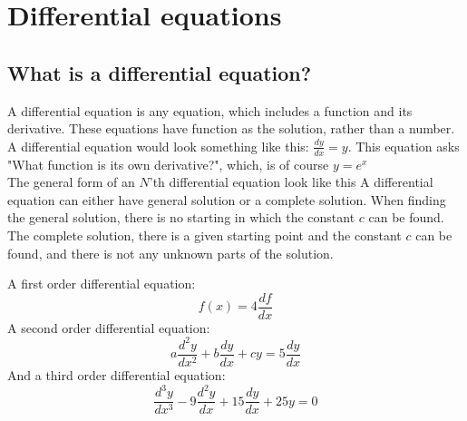 \chapter{Differential equations}
\section{What is a differential equation?}
A differential equation is any equation, which includes a function and its derivative. These equations have function as the solution, rather than a number. 
\\
A differential equation would look something like this: $\frac{dy}{dx} = y$. This equation asks "What function is its own derivative?", which, is of course $y=e^x$
\\
The general form of an $N$'th differential equation look like this
A differential equation can either have general solution or a complete solution. When finding the general solution, there is no starting in which the constant $c$ can be found. The complete solution, there is a given starting point and the constant $c$ can be found, and there is not any unknown parts of the solution.
\\
\begin{tcolorbox}[colback=red!5!white,colframe=red!75!black,title=Example of differential equation of different orders] 
A first order differential equation:
$$f(x)=4\frac{df}{dx} $$
A second order differential equation:
$$a\frac{d^2y}{dx^2}+b\frac{dy}{dx}+cy = 5\frac{dy}{dx}$$
And a third order differential equation:
$$\frac{d^3y}{dx^3} - 9\frac{d^2y}{dx} + 15\frac{dy}{dx} + 25y = 0$$
\end{tcolorbox}
